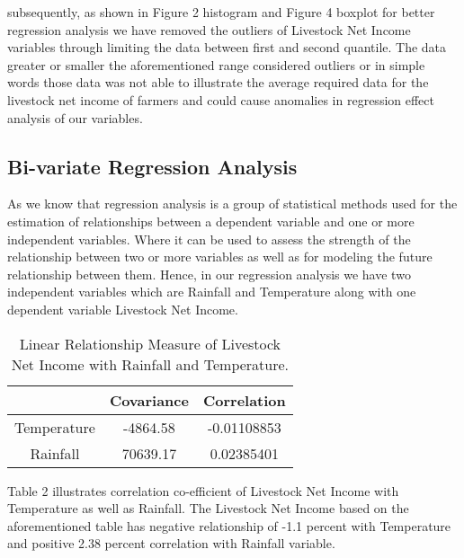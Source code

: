 \documentclass[12pt, a4]{article}
\begin{document}
\vspace{0.75\baselineskip}

subsequently, as shown in Figure 2 histogram and Figure 4 boxplot for better regression analysis we have
removed the outliers of Livestock Net Income  variables through limiting the data between first and second quantile. The data greater or smaller the aforementioned range considered outliers or in simple words those data was not able to illustrate the average required data for the livestock
net income of farmers and could cause anomalies in regression effect analysis of our variables. 
    
\vspace{0.5\baselineskip}

\subsection{Bi-variate Regression Analysis}

As we know that regression analysis is a group of statistical methods used for the estimation of relationships between a dependent variable and one or more independent variables. Where it can be used to assess the strength of the relationship between two or more variables as well as for modeling the future relationship between them. Hence, in our regression analysis we have two independent variables which are Rainfall and Temperature along with one dependent variable Livestock Net Income. 
 
 

 
\begin{table}[h]
\centering
\caption{Linear Relationship Measure of Livestock Net Income with Rainfall and Temperature.}
\label{tab:my-table}
\begin{tabular}{ccc}
            & Covariance & Correlation \\ \hline
Temperature & -4864.58   & -0.01108853 \\ \cline{1-1}
Rainfall    & 70639.17   & 0.02385401  \\ \hline
\end{tabular}
\end{table}


Table 2 illustrates correlation co-efficient of Livestock Net Income with Temperature as well as Rainfall. The Livestock Net Income based on the aforementioned table has negative relationship of -1.1 percent with Temperature and positive 2.38 percent correlation with Rainfall variable.
\end{document}
